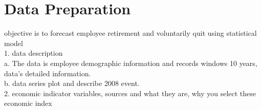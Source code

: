\documentclass[12pt,letterpaper]{article}
\begin{document}
\section{Data Preparation}
objective is to forecast employee retirement and voluntarily quit using statistical model\\
1. data description \\
a. The data is employee demographic information and records windows 10 years, data's detailed information. \\
%
b. data series plot and describe 2008 event.\\
2. economic indicator variables, sources and what they are, why you select these economic index\\
\end{document}
